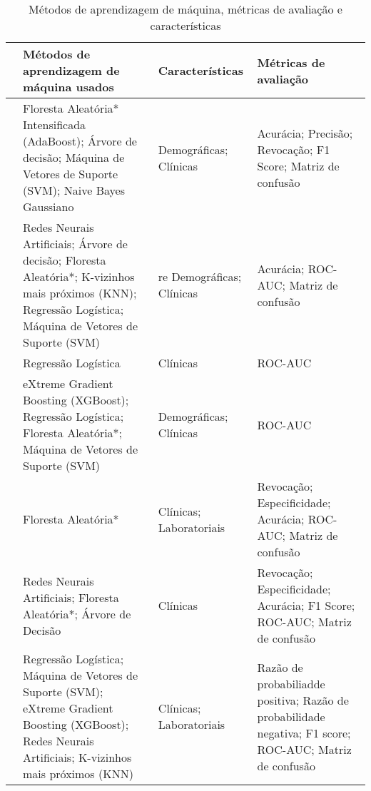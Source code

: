 \begin{table}[!htb]  \footnotesize
\centering
\caption{Métodos de aprendizagem de máquina, métricas de avaliação e características}
\label{tab_trabalhos_relacionados}
\begin{tabular}{| p{4.0cm} | p{4.3cm} | p{2.5cm} | p{3.7cm} | }
\hline\hline
&
  \textbf{Métodos de aprendizagem de máquina usados} &
  \textbf{Características} &
  \textbf{Métricas de avaliação} \\ \hline

  
\textbf{\cite{iwendi2020covid}} & Floresta Aleatória* Intensificada (AdaBoost); Árvore de decisão; Máquina de Vetores de Suporte (SVM); Naive Bayes Gaussiano & Demográficas; Clínicas & 
Acurácia; Precisão; Revocação; F1 Score; Matriz de confusão \\ \hline
  
\textbf{\cite{pourhomayoun2020predicting}} &
  Redes Neurais Artificiais; Árvore de decisão; Floresta Aleatória*; K-vizinhos mais próximos (KNN); Regressão Logística; Máquina de Vetores de Suporte (SVM) &re
  Demográficas; Clínicas &
Acurácia; ROC-AUC;  Matriz de confusão \\ \hline
  
\textbf{\cite{zhao2020prediction}} &
  Regressão Logística &
  Clínicas &
  ROC-AUC \\ \hline
  
\textbf{\cite{yadaw2020clinical}} &
  eXtreme Gradient Boosting (XGBoost); Regressão Logística; Floresta Aleatória*; Máquina de Vetores de Suporte (SVM) &
  Demográficas; Clínicas &
  ROC-AUC \\ \hline
  
\textbf{\cite{cheng2020using}} &
  Floresta Aleatória* &
  Clínicas; Laboratoriais &
  Revocação; Especificidade; Acurácia; ROC-AUC; Matriz de confusão\\ \hline
  
\textbf{\cite{assaf2020utilization}} &
  Redes Neurais Artificiais; Floresta Aleatória*; Árvore de Decisão &
  Clínicas &
  Revocação; Especificidade; Acurácia; F1 Score; ROC-AUC;  Matriz de confusão\\ \hline
  
\textbf{\cite{gao2020machine}} &
  Regressão Logística; Máquina de Vetores de Suporte (SVM); eXtreme Gradient Boosting (XGBoost); Redes Neurais Artificiais; K-vizinhos mais próximos (KNN) &
  Clínicas; Laboratoriais &
  Razão de probabiliadde positiva; Razão de probabilidade negativa; F1 score; ROC-AUC; Matriz de confusão\\ \hline
  

\end{tabular}
\end{table}
